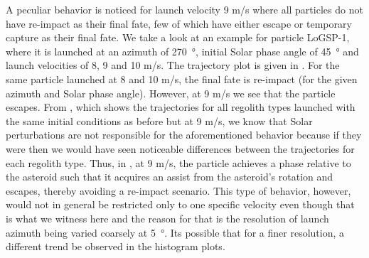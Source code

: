 A peculiar behavior is noticed for launch velocity 9 m/s where all particles do not have re-impact as their final fate, few of which have either escape or temporary capture as their final fate. We take a look at an example for particle LoGSP-1, where it is launched at an azimuth of \SI{270}{\degree}, initial Solar phase angle of \SI{45}{\degree} and launch velocities of 8, 9 and 10 m/s. The trajectory plot is given in . For the same particle launched at 8 and 10 m/s, the final fate is re-impact (for the given azimuth and Solar phase angle). However, at 9 m/s we see that the particle escapes. From , which shows the trajectories for all regolith types launched with the same initial conditions as before but at 9 m/s, we know that Solar perturbations are not responsible for the aforementioned behavior because if they were then we would have seen noticeable differences between the trajectories for each regolith type. Thus, in , at 9 m/s, the particle achieves a phase relative to the asteroid such that it acquires an assist from the asteroid's rotation and escapes, thereby avoiding a re-impact scenario. This type of behavior, however, would not in general be restricted only to one specific velocity even though that is what we witness here and the reason for that is the resolution of launch azimuth being varied coarsely at \SI{5}{\degree}. Its possible that for a finer resolution, a different trend be observed in the histogram plots.

